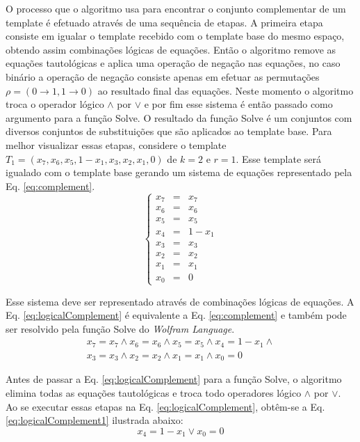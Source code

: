 O processo que o algoritmo usa para encontrar o conjunto complementar de um template é efetuado através de uma sequência de etapas. A primeira etapa consiste em igualar o template recebido com o template base do mesmo espaço, obtendo assim combinações lógicas de equações. Então o algoritmo remove as equações tautológicas e aplica uma operação de negação nas equações, no caso binário a operação de negação consiste apenas em efetuar as permutações $\rho = (0 \rightarrow 1, 1 \rightarrow 0)$ ao resultado final das equações. Neste momento o algoritmo troca o operador lógico $\wedge$ por $\vee$ e por fim esse sistema é então passado como argumento para a função Solve. O resultado da função Solve é um conjuntos com diversos conjuntos de substituições que são aplicados ao template base. Para melhor visualizar essas etapas, considere o template $T_1 = (x_7, x_6, x_5, 1 - x_1, x_3, x_2, x_1, 0)$ de $k=2$ e $r=1$. Esse template será igualado com o template base gerando um sistema de equações representado pela Eq. \eqref{eq:complement}.
\begin{equation}
\left\{\begin{matrix}
x_7 & = & x_7	\\ 
x_6 & = & x_6	\\ 
x_5 & = & x_5	\\ 
x_4 & = & 1 - x_1 \\ 
x_3 & = & x_3	\\ 
x_2 & = & x_2	\\ 
x_1 & = & x_1	\\ 
x_0 & = & 0
\end{matrix}\right.
\label{eq:complement}
\end{equation}

Esse sistema deve ser representado através de combinações lógicas de equações. A Eq. \eqref{eq:logicalComplement} é equivalente a Eq. \eqref{eq:complement} e também pode ser resolvido pela função Solve do \textit{Wolfram Language}.
\begin{equation}
\begin{split}
x_7 = x_7	\wedge  
x_6 = x_6	\wedge  
x_5 = x_5	\wedge  
x_4 = 1 - x_1 \wedge  \\
x_3 = x_3	\wedge  
x_2 = x_2	\wedge  
x_1 = x_1	\wedge  
x_0 = 0
\end{split}
\label{eq:logicalComplement}
\end{equation}

Antes de passar a Eq. \eqref{eq:logicalComplement} para a função Solve, o algoritmo elimina todas as equações tautológicas e troca todo operadores lógico $\wedge$ por $\vee$. Ao se executar essas etapas na Eq. \eqref{eq:logicalComplement}, obtêm-se a Eq. \eqref{eq:logicalComplement1} ilustrada abaixo:
\begin{equation}
x_4 = 1 - x_1 \vee x_0 = 0
\label{eq:logicalComplement1}
\end{equation}

